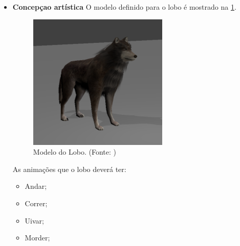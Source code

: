 \begin{itemize}
\newpage
\item {\bf Concepçao artística}
O modelo definido para o lobo é mostrado na \ref{img:lobo}.

\begin{figure}[H]
 \centering
 \includegraphics[scale=1]{Imagens/lobo01.png}
 \caption{Modelo do Lobo. (Fonte: \cite{bib:lobo01})}
\label{img:lobo}
\end{figure}


As animações que o lobo deverá ter:
\begin{itemize}
\item {Andar;}
\item {Correr;}
\item {Uivar;}
\item {Morder;}

\end{itemize}

\end{itemize}
